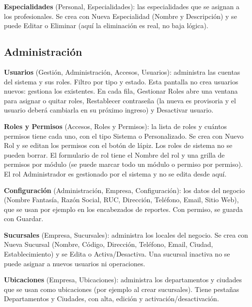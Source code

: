 \textbf{Especialidades} (Personal, Especialidades): las especialidades que se asignan a los profesionales. Se crea con Nueva Especialidad (Nombre y Descripción) y se puede Editar o Eliminar (aquí la eliminación es real, no baja lógica).

\subsection{Administración}
\label{sec:mu-administracion}

\textbf{Usuarios} (Gestión, Administración, Accesos, Usuarios): administra las cuentas del sistema y sus roles. Filtro por tipo y estado. Esta pantalla no crea usuarios nuevos: gestiona los existentes. En cada fila, Gestionar Roles abre una ventana para asignar o quitar roles, Restablecer contraseña (la nueva es provisoria y el usuario deberá cambiarla en su próximo ingreso) y Desactivar usuario.

\textbf{Roles y Permisos} (Accesos, Roles y Permisos): la lista de roles y cuántos permisos tiene cada uno, con el tipo Sistema o Personalizado. Se crea con Nuevo Rol y se editan los permisos con el botón de lápiz. Los roles de sistema no se pueden borrar. El formulario de rol tiene el Nombre del rol y una grilla de permisos por módulo (se puede marcar todo un módulo o permiso por permiso). El rol Administrador es gestionado por el sistema y no se edita desde aquí.

\textbf{Configuración} (Administración, Empresa, Configuración): los datos del negocio (Nombre Fantasía, Razón Social, RUC, Dirección, Teléfono, Email, Sitio Web), que se usan por ejemplo en los encabezados de reportes. Con permiso, se guarda con Guardar.

\textbf{Sucursales} (Empresa, Sucursales): administra los locales del negocio. Se crea con Nueva Sucursal (Nombre, Código, Dirección, Teléfono, Email, Ciudad, Establecimiento) y se Edita o Activa/Desactiva. Una sucursal inactiva no se puede asignar a nuevos usuarios ni operaciones.

\textbf{Ubicaciones} (Empresa, Ubicaciones): administra los departamentos y ciudades que se usan como ubicaciones (por ejemplo al crear sucursales). Tiene pestañas Departamentos y Ciudades, con alta, edición y activación/desactivación.

